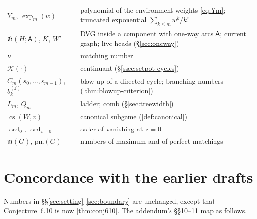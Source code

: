 \documentclass[final]{siamart0516}
\numberwithin{theorem}{section}
\numberwithin{equation}{section}
\theoremstyle{siamnonum}
\theoremstyle{plain}
\newcommand{\cont}{\mathcal{K}}           %
\newcommand{\game}{\mathfrak{G}}          %
\newcommand{\arcs}{\mathsf{A}}            %
\newcommand{\mm}{\mathfrak{m}}            %
\newcommand{\ord}{\operatorname{ord}}
\begin{document}
\begin{center}
\begin{longtable}{@{}L{0.25}L{0.71}@{}}
$Y_m$, $\exp_m(w)$ & polynomial of the environment weights \eqref{eq:Ym}; truncated exponential $\sum_{k\le m}w^k/k!$\\
$\game(H;\arcs)$, $K$, $W'$ & DVG inside a component with one-way arcs $\arcs$; current graph; live heads (\S\ref{sec:oneway})\\
$\nu$ & matching number\\
$\cont(\cdot)$ & continuant (\S\ref{ssec:setpot-cycles})\\
$C_m(s_0,\dots,s_{m-1})$, $b^{(j)}_k$ & blow-up of a directed cycle; branching numbers (\cref{thm:blowup-criterion})\\
$L_m$, $Q_m$ & ladder; comb (\S\ref{sec:treewidth})\\
$\operatorname{cs}(W,v)$ & canonical subgame (\cref{def:canonical})\\
$\ord_0$, $\ord_{z=0}$ & order of vanishing at $z=0$\\
$\mm(G)$, $\mathrm{pm}(G)$ & numbers of maximum and of perfect matchings\\
\bottomrule
\end{longtable}
\end{center}

\section{Concordance with the earlier drafts}\label{app:concordance}

Numbers in \S\S\ref{sec:setting}--\ref{sec:boundary} are unchanged, except that Conjecture~6.10 is now \cref{thm:conj610}. The addendum's \S\S10--11 map as follows.
\end{document}
